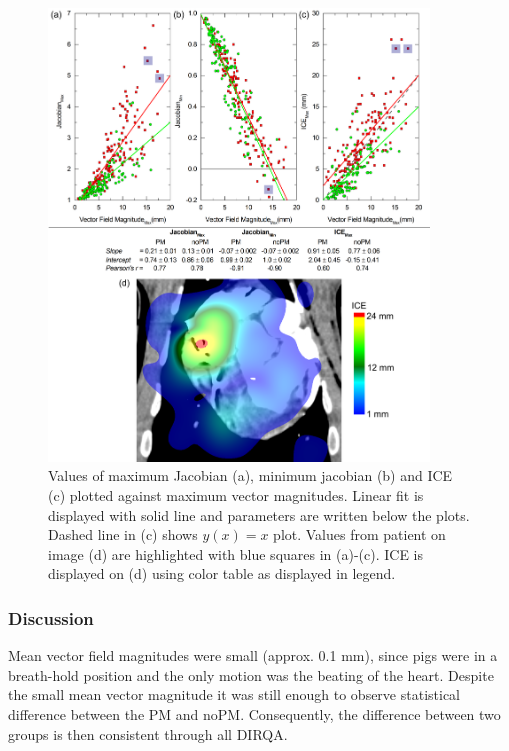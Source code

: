 \documentclass[type=dr, dr=rernat, accentcolor=tud7b,colorbacktitle, bigchapter, openright, twoside, 12pt ]{tudthesis}
\begin{document}
\begin{figure}[H]
	\begin{center}		
		\includegraphics[width=0.9\textwidth]{./Images/MaxVfdata_pigs.png}
		\caption{Values of maximum Jacobian (a), minimum jacobian (b) and ICE (c) plotted against maximum vector magnitudes. Linear fit is displayed with solid line and parameters are written below the plots. Dashed line in (c) shows $y(x)= x$ plot. Values from patient on image (d) are highlighted with blue squares in (a)-(c).
			ICE is displayed on (d) using color table as displayed in legend.}
		\label{maxvf_pigs}
	\end{center}
\end{figure}


\subsubsection{Discussion}

Mean vector field magnitudes were small (approx. 0.1 mm), since pigs were in a breath-hold position and the only motion was the beating of the heart. Despite the small mean vector magnitude it was still enough to observe statistical difference between the PM and noPM. Consequently, the difference between two groups is then consistent through all DIRQA.
\end{document}
